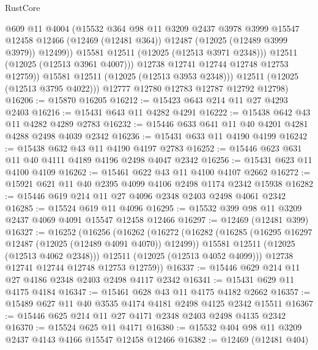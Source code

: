 \begin{lexlean}{RustCore}
\begin{coremodule}
                    @609
                    @11
                    @4004
                    (@15532
                      @364
                      @98
                      @11
                      @3209
                      @2437
                      @3978
                      @3999
                      @15547
                      @12458
                      @12466
                      (@12469 (@12481 @364))
                      @12487
                      (@12025 (@12489 @3999 @3979))
                      @12499))
                  @15581
                  @12511
                  (@12025 (@12513 @3971 @2348)))
                @12511
                (@12025 (@12513 @3961 @4007)))
              @12738
              @12741
              @12744
              @12748
              @12753
              @12759))
          @15581
          @12511
          (@12025 (@12513 @3953 @2348)))
        @12511
        (@12025 (@12513 @3795 @4022)))
      @12777
      @12780
      @12783
      @12787
      @12792
      @12798)
@16206 := @15870 @16205
@16212 := @15423 @643 @214 @11 @27 @4293 @2403
@16216 := @15431 @643 @11 @4282 @4291
@16222 := @15438 @642 @43 @11 @4282 @4289 @2783
@16232 := @15446 @633 @641 @11 @40 @4201 @4281 @4288 @2498 @4039 @2342
@16236 := @15431 @633 @11 @4190 @4199
@16242 := @15438 @632 @43 @11 @4190 @4197 @2783
@16252 := @15446 @623 @631 @11 @40 @4111 @4189 @4196 @2498 @4047 @2342
@16256 := @15431 @623 @11 @4100 @4109
@16262 := @15461 @622 @43 @11 @4100 @4107 @2662
@16272 := @15921 @621 @11 @40 @2395 @4099 @4106 @2498 @1174 @2342 @15938
@16282 := @15446 @619 @214 @11 @27 @4096 @2348 @2403 @2498 @4061 @2342
@16285 := @15524 @619 @11 @4096
@16295 := @15532 @399 @98 @11 @3209 @2437 @4069 @4091 @15547 @12458 @12466
@16297 := @12469 (@12481 @399)
@16327 := @16252
    (@16256
      (@16262
        (@16272
          (@16282
            (@16285 (@16295 @16297 @12487 (@12025 (@12489 @4091 @4070)) @12499))
            @15581
            @12511
            (@12025 (@12513 @4062 @2348)))
          @12511
          (@12025 (@12513 @4052 @4099)))
        @12738
        @12741
        @12744
        @12748
        @12753
        @12759))
@16337 := @15446 @629 @214 @11 @27 @4186 @2348 @2403 @2498 @4117 @2342
@16341 := @15431 @629 @11 @4175 @4184
@16347 := @15461 @628 @43 @11 @4175 @4182 @2662
@16357 := @15489 @627 @11 @40 @3535 @4174 @4181 @2498 @4125 @2342 @15511
@16367 := @15446 @625 @214 @11 @27 @4171 @2348 @2403 @2498 @4135 @2342
@16370 := @15524 @625 @11 @4171
@16380 := @15532 @404 @98 @11 @3209 @2437 @4143 @4166 @15547 @12458 @12466
@16382 := @12469 (@12481 @404)

\end{coremodule}
\end{lexlean}

